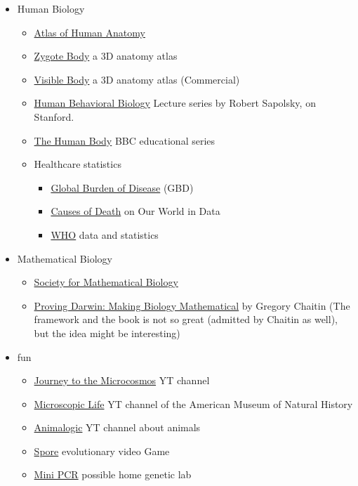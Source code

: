 \documentclass{article}
\begin{document}
\begin{itemize}
    \item Human Biology
    \begin{itemize}
        \item \href{https://www.goodreads.com/book/show/45843.Atlas_of_Human_Anatomy}{Atlas of Human Anatomy}
        \item \href{https://www.zygotebody.com/}{Zygote Body} a 3D anatomy atlas
        \item \href{https://www.visiblebody.com/en-us/}{Visible Body} a 3D anatomy atlas (Commercial)
        \item \href{https://www.youtube.com/playlist?list=PL848F2368C90DDC3D}{Human Behavioral Biology} Lecture series by Robert Sapolsky, on Stanford.
        \item \href{https://www.imdb.com/title/tt0200346/}{The Human Body} BBC educational series
        \item Healthcare statistics
        \begin{itemize}
            \item \href{https://vizhub.healthdata.org/gbd-compare/}{Global Burden of Disease} (GBD)
            \item \href{https://ourworldindata.org/causes-of-death}{Causes of Death} on Our World in Data
            \item \href{https://www.who.int/data/gho}{WHO} data and statistics
        \end{itemize}
    \end{itemize}
    
    \item Mathematical Biology
    \begin{itemize}
        \item \href{https://www.smb.org/}{Society for Mathematical Biology}
        \item \href{https://www.goodreads.com/book/show/13151411-proving-darwin}{Proving Darwin: Making Biology Mathematical} by Gregory Chaitin (The framework and the book is not so great (admitted by Chaitin as well), but the idea might be interesting)
    \end{itemize}
    
    \item fun
    \begin{itemize}
        \item \href{https://www.youtube.com/channel/UCBbnbBWJtwsf0jLGUwX5Q3g}{Journey to the Microcosmos} YT channel
        \item \href{https://www.youtube.com/playlist?list=PLrfcruGtplwH9gqNUy23btvvRuyhGw1sH}{Microscopic Life} YT channel of the American Museum of Natural History
        \item \href{https://www.youtube.com/channel/UCwg6_F2hDHYrqbNSGjmar4w}{Animalogic} YT channel about animals
        \item \href{https://www.spore.com/}{Spore} evolutionary video Game
        \item \href{https://www.minipcr.com/}{Mini PCR} possible home genetic lab
    \end{itemize}
    

\end{itemize}
\end{document}
